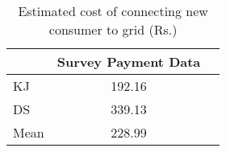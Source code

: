 \begin{table}[htbp]\centering
\caption{Estimated cost of connecting new consumer to grid (Rs.)}
\begin{tabular}{l*{2}{c}}
\toprule
                    &            Survey Payment Data\\
\midrule
KJ                  &        192.16\\
DS                  &         339.13\\
Mean                &        228.99\\
\bottomrule
\end{tabular}
\end{table}
